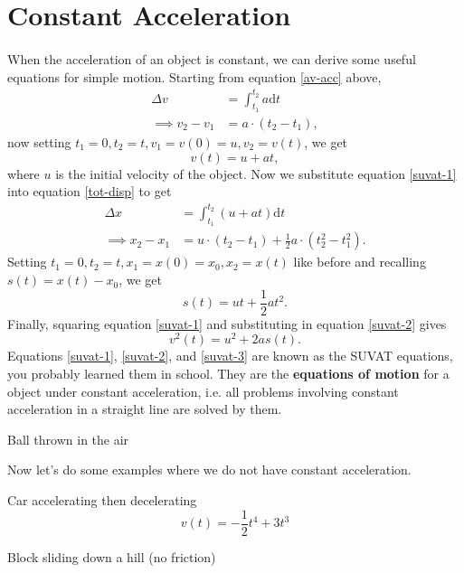 \documentclass[../newtonian_mechanics.tex]{subfiles}
\begin{document}
    \section{Constant Acceleration}
        \paragraph{}
        When the acceleration of an object is constant, we can derive some useful equations for simple motion. Starting from equation \ref{av-acc} above,
        \begin{align*}
            \Delta v&=\int_{t_1}^{t_2}a\mathrm{d}t\\
            \implies v_2-v_1&=a\cdot(t_2-t_1),
        \end{align*}
        now setting $t_1=0,t_2=t,v_1=v(0)=u,v_2=v(t)$, we get
        \begin{equation}\label{suvat-1}
            v(t)=u+at,
        \end{equation}
        where $u$ is the initial velocity of the object.
        Now we substitute equation \ref{suvat-1} into equation \ref{tot-disp} to get
        \begin{align*}
            \Delta x&=\int_{t_1}^{t_2}(u+at)\mathrm{d}t\\
            \implies x_2-x_1&=u\cdot(t_2-t_1)+\frac{1}{2}a\cdot(t_2^2-t_1^2).
        \end{align*}
        Setting $t_1=0,t_2=t,x_1=x(0)=x_0,x_2=x(t)$ like before and recalling $s(t)=x(t)-x_0$, we get
        \begin{equation}\label{suvat-2}
            s(t)=ut+\frac{1}{2}at^2.
        \end{equation}
        Finally, squaring equation \ref{suvat-1} and substituting in equation \ref{suvat-2} gives
        \begin{equation}\label{suvat-3}
            v^2(t)=u^2+2as(t).
        \end{equation}
        Equations \ref{suvat-1}, \ref{suvat-2}, and \ref{suvat-3} are known as the SUVAT equations, you probably learned them in school. They are the \textbf{equations of motion} for a object under constant acceleration, i.e. all problems involving constant acceleration in a straight line are solved by them.
        \begin{example}
            Ball thrown in the air
        \end{example}

        Now let's do some examples where we do not have constant acceleration.
        \begin{example}
            Car accelerating then decelerating
            \begin{equation*}
                v(t)=-\frac{1}{2}t^4+3t^3
            \end{equation*}
        \end{example}
        \begin{example}
            Block sliding down a hill (no friction)
        \end{example}
\end{document}
